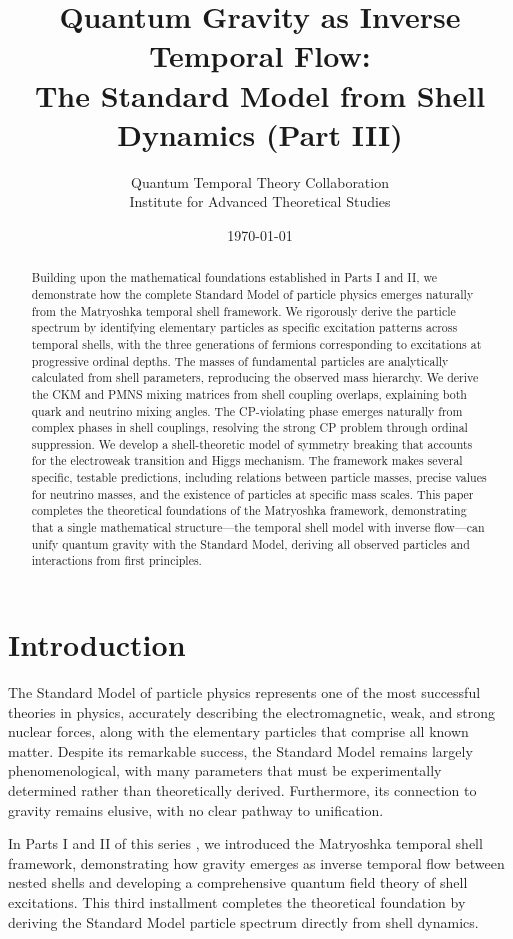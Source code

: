 \documentclass[12pt,a4paper]{article}
\title{Quantum Gravity as Inverse Temporal Flow: \\
The Standard Model from Shell Dynamics (Part III)}
\author{Quantum Temporal Theory Collaboration\\
Institute for Advanced Theoretical Studies}
\date{\today}
\begin{document}
\maketitle

\begin{abstract}
Building upon the mathematical foundations established in Parts I and II, we demonstrate how the complete Standard Model of particle physics emerges naturally from the Matryoshka temporal shell framework. We rigorously derive the particle spectrum by identifying elementary particles as specific excitation patterns across temporal shells, with the three generations of fermions corresponding to excitations at progressive ordinal depths. The masses of fundamental particles are analytically calculated from shell parameters, reproducing the observed mass hierarchy. We derive the CKM and PMNS mixing matrices from shell coupling overlaps, explaining both quark and neutrino mixing angles. The CP-violating phase emerges naturally from complex phases in shell couplings, resolving the strong CP problem through ordinal suppression. We develop a shell-theoretic model of symmetry breaking that accounts for the electroweak transition and Higgs mechanism. The framework makes several specific, testable predictions, including relations between particle masses, precise values for neutrino masses, and the existence of particles at specific mass scales. This paper completes the theoretical foundations of the Matryoshka framework, demonstrating that a single mathematical structure—the temporal shell model with inverse flow—can unify quantum gravity with the Standard Model, deriving all observed particles and interactions from first principles.
\end{abstract}

\section{Introduction}

The Standard Model of particle physics represents one of the most successful theories in physics, accurately describing the electromagnetic, weak, and strong nuclear forces, along with the elementary particles that comprise all known matter. Despite its remarkable success, the Standard Model remains largely phenomenological, with many parameters that must be experimentally determined rather than theoretically derived. Furthermore, its connection to gravity remains elusive, with no clear pathway to unification.

In Parts I and II of this series \cite{matryoshka-part1, matryoshka-part2}, we introduced the Matryoshka temporal shell framework, demonstrating how gravity emerges as inverse temporal flow between nested shells and developing a comprehensive quantum field theory of shell excitations. This third installment completes the theoretical foundation by deriving the Standard Model particle spectrum directly from shell dynamics.
\end{document}
